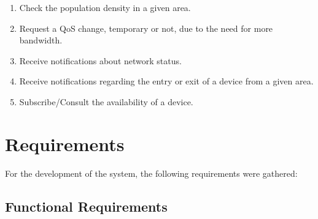 \begin{itemize}
\begin{enumerate}
		      \item Check the population density in a given area.

		      \item Request a QoS change, temporary or not, due to the need for more
		            bandwidth.

		      \item Receive notifications about network status.

		      \item Receive notifications regarding the entry or exit of a device from
		            a given area.

		      \item Subscribe/Consult the availability of a device.
	      \end{enumerate}
\end{itemize}

\section{Requirements}

For the development of the system, the following requirements were gathered:

\subsection{Functional Requirements}

